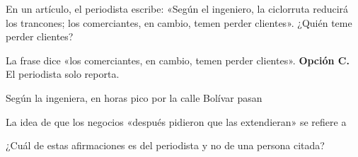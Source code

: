 \begin{reto}
En un artículo, el periodista escribe: «Según el ingeniero, la ciclorruta reducirá los trancones; los comerciantes, en
cambio, temen perder clientes». ¿Quién teme perder clientes?
\end{reto}

\begin{retoresuelto}
La frase dice «los comerciantes, en cambio, temen perder clientes». \textbf{Opción C.} El periodista solo reporta.
\end{retoresuelto}

\taller
{}
\begin{ejercicios}
\item Según la ingeniera, en horas pico por la calle Bolívar pasan
\item La idea de que los negocios «después pidieron que las extendieran»  se refiere a
\item ¿Cuál de estas afirmaciones es del periodista y no de una persona citada?
\end{ejercicios}

\bitacora

